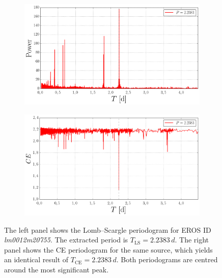 \begin{figure}[h]
	\centering
	\begin{subfigure}[t]{0.49\textwidth}
		\centering
		\label{fig:periodogram-ls}
		\includegraphics[width=\textwidth]{figures/periodograms/lm0012m20755-fasper.png}
	\end{subfigure}
	\begin{subfigure}[t]{0.49\textwidth}
		\centering
		\label{fig:periodogram-ce}
		\includegraphics[width=\textwidth]{figures/periodograms/lm0012m20755-ce-adaptive.png}
	\end{subfigure}
	\caption[Lomb--Scargle and CE periodograms for EROS ID \emph{lm0012m20755}]{The left panel shows the Lomb--Scargle periodogram for EROS ID \emph{lm0012m20755}. The extracted period is $T_\text{LS} = 2.2383 \, \unit{d}$. The right panel shows the CE periodogram for the same source, which yields an identical result of $T_\text{CE} = 2.2383 \, \unit{d}$. Both periodograms are centred around the most significant peak.}
	\label{fig:features-periodograms}
\end{figure}


